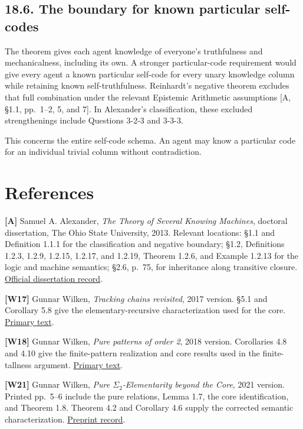 \documentclass[
  11pt,
  letterpaper,
]{article}
\begin{document}
\subsection{18.6. The boundary for known particular
self-codes}\label{the-boundary-for-known-particular-self-codes}

The theorem gives each agent knowledge of everyone's truthfulness and
mechanicalness, including its own. A stronger particular-code
requirement would give every agent a known particular self-code for
every unary knowledge column while retaining known self-truthfulness.
Reinhardt's negative theorem excludes that full combination under the
relevant Epistemic Arithmetic assumptions {[}A, §1.1, pp.~1--2, 5, and
7{]}. In Alexander's classification, these excluded strengthenings
include Questions 3-2-3 and 3-3-3.

This concerns the entire self-code schema. An agent may know a
particular code for an individual trivial column without contradiction.

\section{References}\label{references}

\textbf{{[}A{]}} Samuel A. Alexander, \emph{The Theory of Several
Knowing Machines}, doctoral dissertation, The Ohio State University,
2013. Relevant locations: §1.1 and Definition 1.1.1 for the
classification and negative boundary; §1.2, Definitions 1.2.3, 1.2.9,
1.2.15, 1.2.17, and 1.2.19, Theorem 1.2.6, and Example 1.2.13 for the
logic and machine semantics; §2.6, p.~75, for inheritance along
transitive closure.
\href{https://etd.ohiolink.edu/acprod/odb_etd/etd/r/1501/10?clear=10&p10_accession_num=osu1366362999}{Official
dissertation record}.

\textbf{{[}W17{]}} Gunnar Wilken, \emph{Tracking chains revisited}, 2017
version. §5.1 and Corollary 5.8 give the elementary-recursive
characterization used for the core.
\href{https://arxiv.org/html/1611.04348v3}{Primary text}.

\textbf{{[}W18{]}} Gunnar Wilken, \emph{Pure patterns of order 2}, 2018
version. Corollaries 4.8 and 4.10 give the finite-pattern realization
and core results used in the finite-tallness argument.
\href{https://arxiv.org/html/1608.08421v5}{Primary text}.

\textbf{{[}W21{]}} Gunnar Wilken, \emph{Pure \(\Sigma_2\)-Elementarity
beyond the Core}, 2021 version. Printed pp.~5--6 include the pure
relations, Lemma 1.7, the core identification, and Theorem 1.8. Theorem
4.2 and Corollary 4.6 supply the corrected semantic characterization.
\href{https://arxiv.org/abs/1710.01870}{Preprint record}.
\end{document}

